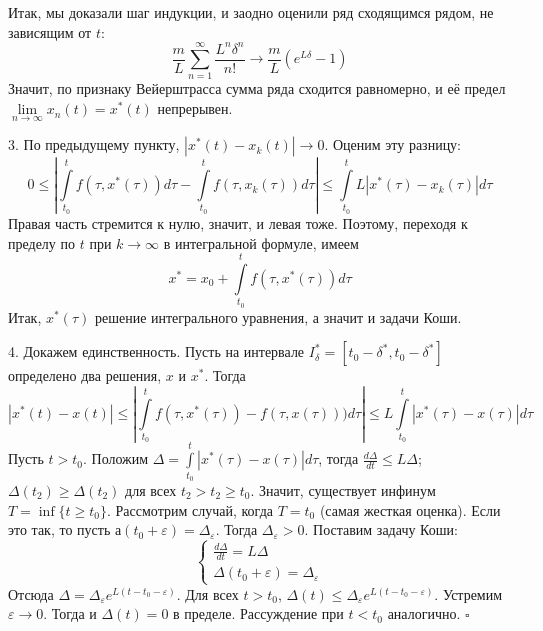 Итак, мы доказали шаг индукции, и заодно оценили ряд сходящимся рядом, не 
зависящим от $t:$
$$\frac{m}{L}\sum\limits_{n=1}^{\infty}\frac{L^n\delta^n}{n!}\to
\frac{m}{L}\left( e^{L\delta}-1 \right)$$
Значит, по признаку Вейерштрасса сумма ряда сходится равномерно, и её 
предел $\lim\limits_{n \to \infty}x_n(t)=x^*(t)$ непрерывен. 

3. По предыдущему пункту, $|x^*(t)-x_k(t)|\to 0$. Оценим эту разницу:
$$0\leqslant 
\left| \int\limits_{t_0}^{t} f(\tau,x^*(\tau))d\tau-\int\limits_{t_0}^{t}
f(\tau,x_k(\tau))d\tau\right|\leqslant 
\int\limits_{t_0}^{t}L|x^*(\tau)-x_k(\tau)|d\tau$$
Правая часть стремится к нулю, значит, и левая тоже. Поэтому, переходя к
пределу  по $t$ при  $k\to \infty$ в интегральной формуле, имеем
$$x^*=x_0+\int\limits_{t_0}^{t}f(\tau,x^*(\tau))d\tau$$
Итак, $x^*(\tau)$ решение интегрального уравнения, а значит и задачи Коши. 

4. Докажем единственность. Пусть на интервале  $I^*_\delta=
[t_0-\delta^*,t_0-\delta^*]$ определено
два решения, $x$ и  $x^*$. Тогда
$$|x^*(t)-x(t)|\leqslant \left| \int\limits_{t_0}^{t}f(\tau,x^*(\tau))-
f(\tau,x(\tau))) d\tau \right|\leqslant L \int\limits_{t_0}^{t}|x^*(\tau)-
x(\tau)|d\tau$$
Пусть $t>t_0$. Положим  
$\Delta= \int\limits_{t_0}^{t}|x^*(\tau)-x(\tau)|d\tau$, тогда 
$\frac{d\Delta}{dt}\leqslant L\Delta$; $\Delta(t_2)\geqslant\Delta(t_2)$
для всех $t_2>t_2\geqslant t_{0}$. 
Значит, существует инфинум 
$T=\inf \{t\geqslant t_0\}$. Рассмотрим случай, когда $T=t_0$ (самая жесткая
оценка). Если это так, то пусть $а(t_0+\varepsilon)=\Delta_\varepsilon$. 
Тогда $\Delta_\varepsilon>0$. Поставим задачу Коши:
$$\begin{cases}
    \frac{d\Delta}{dt}=L\Delta\\ \Delta(t_0+\varepsilon)=\Delta_\varepsilon
\end{cases}$$
Отсюда $\Delta=\Delta_\varepsilon e^{L(t-t_0-\varepsilon)}$. Для всех
$t>t_0$,  $\Delta(t)\leqslant\Delta_\varepsilon e^{L(t-t_0-\varepsilon)}$.
Устремим $\varepsilon\to0$. Тогда и $\Delta(t)=0$ в пределе. 
Рассуждение при $t<t_0$ аналогично. $\square$


